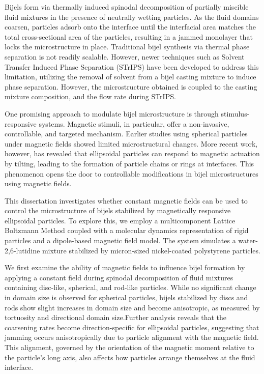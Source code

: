 \begin{front}
    Bijels form via thermally induced spinodal decomposition of partially miscible fluid mixtures in the presence of neutrally 
    wetting particles. As the fluid domains coarsen, particles adsorb onto the interface until the interfacial area matches the 
    total cross-sectional area of the particles, resulting in a jammed monolayer that locks the microstructure in place. Traditional 
    bijel synthesis via thermal phase separation is not readily scalable. However, newer techniques such as Solvent Transfer Induced 
    Phase Separation (STrIPS) have been developed to address this limitation, utilizing the removal of solvent from a bijel casting
    mixture to induce phase separation. However, the microstructure obtained is coupled to the casting mixture composition, 
    and the flow rate during STrIPS.
    
    One promising approach to modulate bijel microstructure is through stimulus-responsive systems. Magnetic stimuli, in particular, 
    offer a non-invasive, controllable, and targeted mechanism. Earlier studies using spherical particles under magnetic fields showed 
    limited microstructural changes. More recent work, however, has revealed that ellipsoidal particles can respond to magnetic actuation 
    by tilting, leading to the formation of particle chains or rings at interfaces. This phenomenon opens the door to controllable 
    modifications in bijel microstructures using magnetic fields.
    
    This dissertation investigates whether constant magnetic fields can be used to control the microstructure of bijels stabilized by 
    magnetically responsive ellipsoidal particles. To explore this, we employ a multicomponent Lattice Boltzmann Method coupled with a 
    molecular dynamics representation of rigid particles and a dipole-based magnetic field model. The system simulates a water-2,6-lutidine 
    mixture stabilized by micron-sized nickel-coated polystyrene particles.
    
    We first examine the ability of magnetic fields to influence bijel formation by applying a constant field during spinodal decomposition 
    of fluid mixtures containing disc-like, spherical, and rod-like particles. While no significant change in domain size is observed for 
    spherical particles, bijels stabilized by discs and rods show slight increases in domain size and become anisotropic, as measured by 
    tortuosity and directional domain size.Further analysis reveals that the coarsening rates become direction-specific for ellipsoidal particles, 
    suggesting that jamming occurs anisotropically due to particle alignment with the magnetic field. This alignment, governed by the 
    orientation of the magnetic moment relative to the particle's long axis, also affects how particles arrange themselves at the fluid 
    interface.
    

\end{front}
